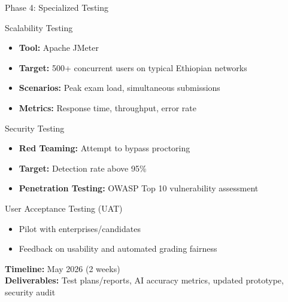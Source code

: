 \begin{frame}{Phase 4: Specialized Testing}
    \begin{block}{Scalability Testing}
        \begin{itemize}
            \item \textbf{Tool:} Apache JMeter
            \item \textbf{Target:} 500+ concurrent users on typical Ethiopian networks
            \item \textbf{Scenarios:} Peak exam load, simultaneous submissions
            \item \textbf{Metrics:} Response time, throughput, error rate
        \end{itemize}
    \end{block}
    
    \begin{block}{Security Testing}
        \begin{itemize}
            \item \textbf{Red Teaming:} Attempt to bypass proctoring
            \item \textbf{Target:} Detection rate above 95\%
            \item \textbf{Penetration Testing:} OWASP Top 10 vulnerability assessment
        \end{itemize}
    \end{block}
    
    \begin{block}{User Acceptance Testing (UAT)}
        \begin{itemize}
            \item Pilot with enterprises/candidates
            \item Feedback on usability and automated grading fairness
        \end{itemize}
    \end{block}
    
    \textbf{Timeline:} May 2026 (2 weeks) \\
    \textbf{Deliverables:} Test plans/reports, AI accuracy metrics, updated prototype, security audit
\end{frame}

